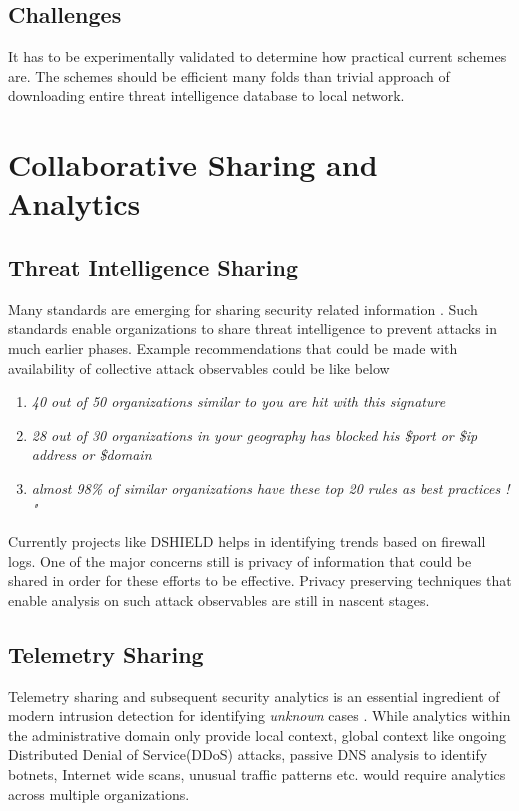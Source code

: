 \documentclass[runningheads,a4paper]{llncs}
\begin{document}
\subsection{Challenges}
It has to be experimentally validated to determine how practical current schemes are. The schemes should be efficient many folds than trivial approach of downloading entire threat intelligence database to local network.


\section{Collaborative Sharing and Analytics}
\subsection{Threat Intelligence Sharing}
Many standards are emerging for sharing security related information \cite{mitre}.  Such standards enable organizations to share threat intelligence to prevent attacks in much earlier phases.
Example recommendations that could be made with availability of collective attack observables could be like below

\begin{enumerate}
\item  \emph{40 out of 50 organizations similar to you are hit with this signature}
\item \emph{28 out of 30 organizations in your geography has blocked his \$port or \$ip address or \$domain }\item \emph {almost 98\% of similar organizations have these top 20 rules as best practices ! " }
\end{enumerate}
Currently projects like DSHIELD helps in identifying trends based on firewall logs.  One of the major concerns still is privacy of information that could be shared in order for these efforts to be effective.  Privacy preserving techniques that enable analysis on such attack observables are still in nascent stages. 

\subsection{Telemetry Sharing}
Telemetry sharing and subsequent security analytics is an essential ingredient of modern intrusion detection for identifying \emph{unknown} cases \cite{bd}. While analytics within the administrative domain only provide local context, global context like ongoing Distributed Denial of Service(DDoS) attacks, passive DNS analysis to identify botnets, Internet wide scans, unusual traffic patterns etc. would require analytics across multiple organizations. 
\end{document}
